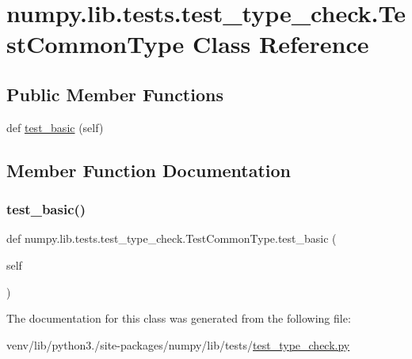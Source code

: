 \hypertarget{classnumpy_1_1lib_1_1tests_1_1test__type__check_1_1TestCommonType}{}\section{numpy.\+lib.\+tests.\+test\+\_\+type\+\_\+check.\+Test\+Common\+Type Class Reference}
\label{classnumpy_1_1lib_1_1tests_1_1test__type__check_1_1TestCommonType}
\subsection*{Public Member Functions}
\begin{DoxyCompactItemize}
\item 
def \hyperlink{classnumpy_1_1lib_1_1tests_1_1test__type__check_1_1TestCommonType_a5bc4324823d429c173bcb1365a554439}{test\+\_\+basic} (self)
\end{DoxyCompactItemize}


\subsection{Member Function Documentation}
\mbox{\label{classnumpy_1_1lib_1_1tests_1_1test__type__check_1_1TestCommonType_a5bc4324823d429c173bcb1365a554439}} 
\subsubsection{\texorpdfstring{test\+\_\+basic()}{test\_basic()}}
{\footnotesize\ttfamily def numpy.\+lib.\+tests.\+test\+\_\+type\+\_\+check.\+Test\+Common\+Type.\+test\+\_\+basic (\begin{DoxyParamCaption}\item[{}]{self }\end{DoxyParamCaption})}



The documentation for this class was generated from the following file\+:\begin{DoxyCompactItemize}
\item 
venv/lib/python3./site-\/packages/numpy/lib/tests/\hyperlink{test__type__check_8py}{test\+\_\+type\+\_\+check.\+py}\end{DoxyCompactItemize}
